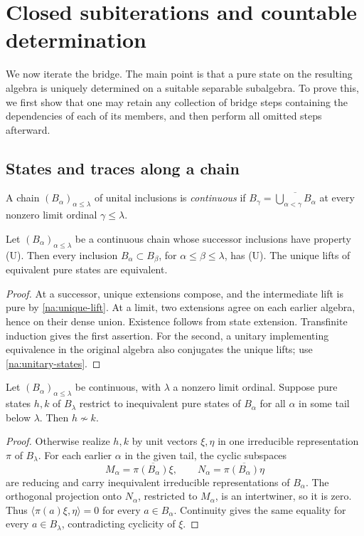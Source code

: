\section{Closed subiterations and countable determination}
\label{sec:iteration}

We now iterate the bridge. The main point is that a pure state on the
resulting algebra is uniquely determined on a suitable separable
subalgebra. To prove this, we first show that one may retain any collection
of bridge steps containing the dependencies of each of its members,
and then perform all omitted steps afterward.

\subsection{States and traces along a chain}

A chain $(B_\alpha)_{\alpha\le\lambda}$ of unital inclusions is
\emph{continuous} if
$B_\gamma=\overline{\bigcup_{\alpha<\gamma}B_\alpha}$ at every nonzero
limit ordinal $\gamma\le\lambda$.

\begin{lemma}\label{na:unique-chain}
Let $(B_\alpha)_{\alpha\le\lambda}$ be a continuous chain whose
successor inclusions have property \textup{(U)}. Then every inclusion
$B_\alpha\subset B_\beta$, for $\alpha\le\beta\le\lambda$, has
\textup{(U)}. The unique lifts of equivalent pure states are equivalent.
\end{lemma}
\begin{proof}
At a successor, unique extensions compose, and the intermediate lift
is pure by \cref{na:unique-lift}. At a limit, two extensions agree on
each earlier algebra, hence on their dense union. Existence follows
from state extension. Transfinite induction gives the first assertion.
For the second, a unitary implementing equivalence in the original
algebra also conjugates the unique lifts; use
\cref{na:unitary-states}.
\end{proof}

\begin{lemma}\label{na:inequivalent-limit}
Let $(B_\alpha)_{\alpha\le\lambda}$ be continuous, with $\lambda$ a
nonzero limit ordinal. Suppose pure states $h,k$ of $B_\lambda$ restrict
to inequivalent pure states of $B_\alpha$ for all $\alpha$ in some tail
below $\lambda$. Then $h\not\sim k$.
\end{lemma}
\begin{proof}
Otherwise realize $h,k$ by unit vectors $\xi,\eta$ in one irreducible
representation $\pi$ of $B_\lambda$. For each earlier $\alpha$ in the
given tail, the cyclic subspaces
\[
 M_\alpha=\overline{\pi(B_\alpha)\xi},\qquad
 N_\alpha=\overline{\pi(B_\alpha)\eta}
\]
are reducing and carry inequivalent irreducible representations of
$B_\alpha$. The orthogonal projection onto $N_\alpha$, restricted to
$M_\alpha$, is an intertwiner, so it is zero. Thus
$\langle\pi(a)\xi,\eta\rangle=0$ for every $a\in B_\alpha$.
Continuity gives the same equality for every $a\in B_\lambda$,
contradicting cyclicity of $\xi$.
\end{proof}

